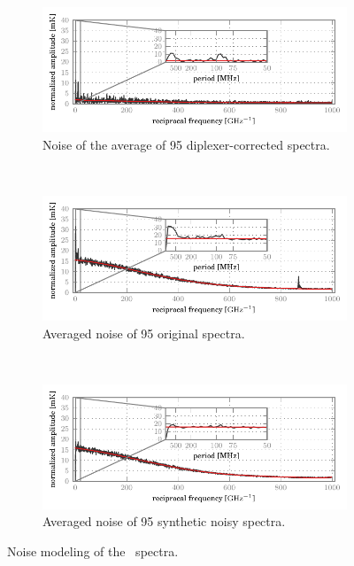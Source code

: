 \begin{figure}[p]
    \centering
    \begin{subfigure}[b]{\textwidth}
        \centering
        \includegraphics{noise_dft_87_correctedavg}
        \vspace{-.8em}
        \caption{Noise of the average of 95  diplexer-corrected spectra.}
    \end{subfigure}
    \\
    \bigskip
    \begin{subfigure}[b]{\textwidth}
        \centering
        \includegraphics{noise_dft_87_original}
        \vspace{-.8em}
        \caption{Averaged noise of 95  original spectra.}
    \end{subfigure}
    \\
    \bigskip
    \begin{subfigure}[b]{\textwidth}
        \centering
        \includegraphics{noise_dft_87_noisy}
        \vspace{-.8em}
        \caption{Averaged noise of 95  synthetic noisy spectra.}
    \end{subfigure}
    \caption{Noise modeling of the~ spectra.}
    \label{fig:noise_model_87}
\end{figure}

